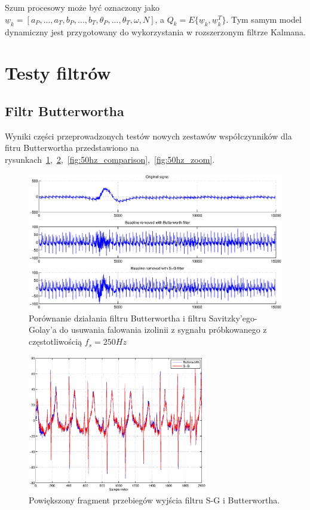 Szum procesowy może być oznaczony jako $\underline{w}_k = \left[ a_P,...,a_T,b_P,...,b_T, \theta_P,...,\theta_T,\omega,N \right]$, a $Q_k = E \{\underline{w}_k, \underline{w}_k^T \}$. Tym samym model dynamiczny jest przygotowany do wykorzystania w rozszerzonym filtrze Kalmana.

\section{Testy filtrów}

\subsection{Filtr Butterwortha}

Wyniki części przeprowadzonych testów nowych zestawów współczynników dla fitru Butterwortha przedstawiono na rysunkach~\ref{fig:bw_removal_comparison},~\ref{fig:bw_removal_zoom},~\ref{fig:50hz_comparison},~\ref{fig:50hz_zoom}.

\begin{figure}[H]
\centering
	\includegraphics[width=\textwidth]{ECG_BASELINE/figures/250_baseline_comparison.eps}
\caption{Porównanie działania filtru Butterwortha i filtru Savitzky'ego-Golay'a do usuwania falowania izolinii z sygnału próbkowanego z częstotliwością $f_s=250 Hz$}
\label{fig:bw_removal_comparison}
\end{figure}

\begin{figure}[H]
\centering
	\includegraphics[width=0.7\textwidth]{ECG_BASELINE/figures/zoom_butter_sg.eps}
\caption{Powiększony fragment przebiegów wyjścia filtru S-G i Butterwortha.}
\label{fig:bw_removal_zoom}
\end{figure}

